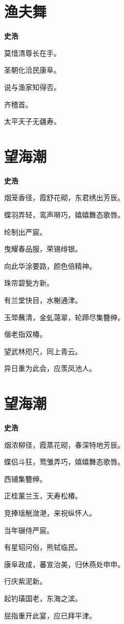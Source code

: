 \documentclass[12pt,a4paper]{ctexbook}
\begin{document}
\section{渔夫舞}
\textbf{史浩}\par\vspace{0.5em}
莫惜清尊长在手。\par
圣朝化洽民康阜。\par
说与渔家知得否。\par
齐稽首。\par
太平天子无疆寿。\par

\section{望海潮}
\textbf{史浩}\par\vspace{0.5em}
烟笼香径，霞舒花砌，东君绣出芳辰。\par
蝶羽弄轻，鸾声啭巧，嬉嬉舞态歌唇。\par
纶制出严宸。\par
曳耀春品服，荣锡绯银。\par
向此华涂要路，颜色倍精神。\par
珠帘碧甃方新。\par
有兰堂快目，水榭通津。\par
玉斝蘸清，金虬蔼翠，轮蹄尽集簪绅。\par
偕老指双椿。\par
望武林咫尺，同上青云。\par
异日重为此会，应羡凤池人。\par

\section{望海潮}
\textbf{史浩}\par\vspace{0.5em}
烟浓柳径，霞蒸花砌，春深特地芳辰。\par
蝶侣斗狂，莺雏弄巧，嬉嬉舞态歌唇。\par
西铺集簪绅。\par
正桂薰兰玉，天寿松椿。\par
竞捧瑶觥潋滟，来祝纵怀人。\par
当年辍侍严宸。\par
有星轺问俗，熊轼临民。\par
康阜政成，蕃宣治美，归休燕处申申。\par
行庆紫泥新。\par
起钓璜国老，东海之滨。\par
屈指重开此宴，应已拜平津。\par
\end{document}
